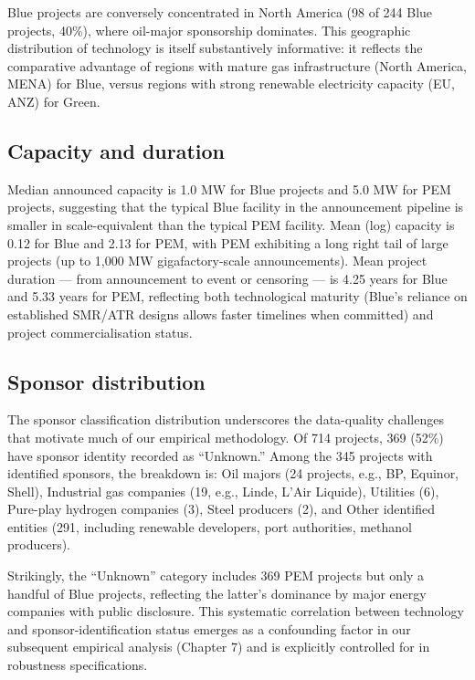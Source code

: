 Blue projects are conversely concentrated in North America (98 of 244 Blue projects, 40\%), where oil-major sponsorship dominates. This geographic distribution of technology is itself substantively informative: it reflects the comparative advantage of regions with mature gas infrastructure (North America, MENA) for Blue, versus regions with strong renewable electricity capacity (EU, ANZ) for Green.

\subsection{Capacity and duration}

Median announced capacity is 1.0 MW for Blue projects and 5.0 MW for PEM projects, suggesting that the typical Blue facility in the announcement pipeline is smaller in scale-equivalent than the typical PEM facility. Mean (log) capacity is 0.12 for Blue and 2.13 for PEM, with PEM exhibiting a long right tail of large projects (up to 1,000 MW gigafactory-scale announcements). Mean project duration --- from announcement to event or censoring --- is 4.25 years for Blue and 5.33 years for PEM, reflecting both technological maturity (Blue's reliance on established SMR/ATR designs allows faster timelines when committed) and project commercialisation status.

\subsection{Sponsor distribution}

The sponsor classification distribution underscores the data-quality challenges that motivate much of our empirical methodology. Of 714 projects, 369 (52\%) have sponsor identity recorded as ``Unknown.'' Among the 345 projects with identified sponsors, the breakdown is: Oil majors (24 projects, e.g., BP, Equinor, Shell), Industrial gas companies (19, e.g., Linde, L'Air Liquide), Utilities (6), Pure-play hydrogen companies (3), Steel producers (2), and Other identified entities (291, including renewable developers, port authorities, methanol producers).

Strikingly, the ``Unknown'' category includes 369 PEM projects but only a handful of Blue projects, reflecting the latter's dominance by major energy companies with public disclosure. This systematic correlation between technology and sponsor-identification status emerges as a confounding factor in our subsequent empirical analysis (Chapter 7) and is explicitly controlled for in robustness specifications.

